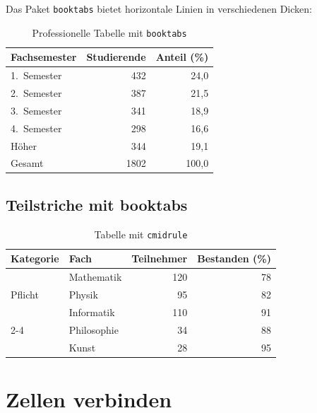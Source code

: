 Das Paket \texttt{booktabs}\cite{mittelbach2004} bietet horizontale Linien in verschiedenen Dicken:

\begin{table}[htbp]
    \centering
    \caption{Professionelle Tabelle mit \texttt{booktabs}}
    \label{tab:booktabs}
    \begin{tabular}{lrr}
        \toprule
        Fachsemester & Studierende & Anteil (\%) \\
        \midrule
        1.\ Semester & 432 & 24{,}0 \\
        2.\ Semester & 387 & 21{,}5 \\
        3.\ Semester & 341 & 18{,}9 \\
        4.\ Semester & 298 & 16{,}6 \\
        Höher & 344 & 19{,}1 \\
        \midrule
        Gesamt & 1802 & 100{,}0 \\
        \bottomrule
    \end{tabular}
\end{table}

\section{Teilstriche mit booktabs}

\begin{table}[htbp]
    \centering
    \caption{Tabelle mit \texttt{cmidrule}}
    \label{tab:cmidrule}
    \begin{tabular}{llrr}
        \toprule
        Kategorie & Fach & Teilnehmer & Bestanden (\%) \\
        \midrule
        \multirow{3}{*}{Pflicht}
            & Mathematik & 120 & 78 \\
            & Physik & 95 & 82 \\
            & Informatik & 110 & 91 \\
        \cmidrule(lr){2-4}
        \multirow{2}{*}{Wahl}
            & Philosophie & 34 & 88 \\
            & Kunst & 28 & 95 \\
        \bottomrule
    \end{tabular}
\end{table}

\chapter{Zellen verbinden}
\label{sec:verbinden}

